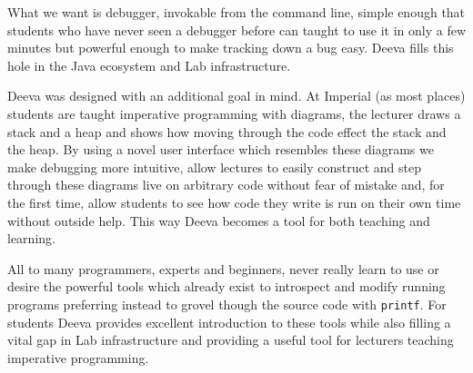\documentclass[11pt, a4paper]{article}
\newcommand{\cmd}[1]{{\tt #1}}
\begin{document}
What we want is debugger, invokable from the command line, simple enough that students who have never seen a debugger before can taught to use it in only a few minutes but powerful enough to make tracking down a bug easy. 
Deeva fills this hole in the Java ecosystem and Lab infrastructure.

Deeva was designed with an additional goal in mind.
At Imperial (as most places) students are taught imperative programming with diagrams, the lecturer draws a stack and a heap and shows how moving through the code effect the stack and the heap.
By using a novel user interface which resembles these diagrams we make debugging more intuitive, allow lectures to easily construct and step through these diagrams live on arbitrary code without fear of mistake and, for the first time, allow students to see how code they write is run on their own time without outside help.
This way Deeva becomes a tool for both teaching and learning.

All to many programmers, experts and beginners, never really learn to use or desire the powerful tools which already exist to introspect and modify running programs preferring instead to grovel though the source code with \cmd{printf}.
For students Deeva provides excellent introduction to these tools while also filling a vital gap in Lab infrastructure and providing a useful tool for lecturers teaching imperative programming.



% 

\end{document}
